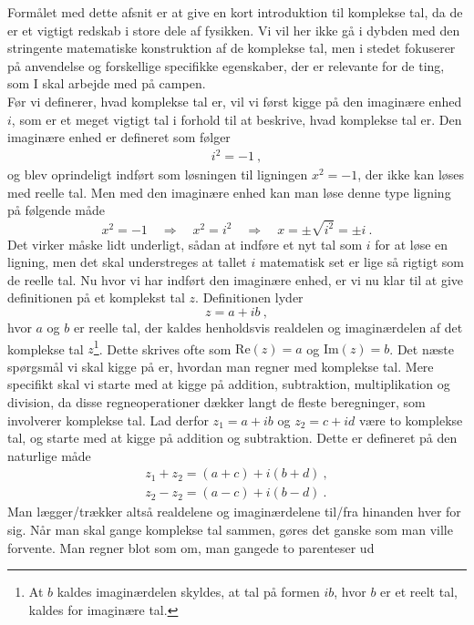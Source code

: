 Formålet med dette afsnit er at give en kort introduktion til komplekse tal, da de er et vigtigt redskab i store dele af fysikken. Vi vil her ikke gå i dybden med den stringente matematiske konstruktion af de komplekse tal, men i stedet fokuserer på anvendelse og forskellige specifikke egenskaber, der er relevante for de ting, som I skal arbejde med på campen.\\

Før vi definerer, hvad komplekse tal er, vil vi først kigge på den imaginære enhed $i$, som er et meget vigtigt tal i forhold til at beskrive, hvad komplekse tal er. Den imaginære enhed er defineret som følger
\begin{eqnarray}
i^2 = -1 \ ,
\end{eqnarray}
og blev oprindeligt indført som løsningen til ligningen $x^2 = -1$, der ikke kan løses med reelle tal. Men med den imaginære enhed kan man løse denne type ligning på følgende måde
$$x^2 = -1 \quad \Rightarrow \quad x^2 = i^2 \quad \Rightarrow \quad x = \pm \sqrt{i^2} = \pm i \ .$$
Det virker måske lidt underligt, sådan at indføre et nyt tal som $i$ for at løse en ligning, men det skal understreges at tallet $i$ matematisk set er lige så rigtigt som de reelle tal. Nu hvor vi har indført den imaginære enhed, er vi nu klar til at give definitionen på et komplekst tal $z$. Definitionen lyder 
\begin{equation}
z = a+ib \ ,
\label{kompleks_def}
\end{equation}  
hvor $a$ og $b$ er reelle tal, der kaldes henholdsvis realdelen og imaginærdelen af det komplekse tal $z$\footnote{At $b$ kaldes imaginærdelen skyldes, at tal på formen $ib$, hvor $b$ er et reelt tal, kaldes for imaginære tal.}.  Dette skrives ofte som $\text{Re}(z) = a$ og $\text{Im}(z) = b$. Det næste spørgsmål vi skal kigge på er, hvordan man regner med komplekse tal. Mere specifikt skal vi starte med at kigge på addition, subtraktion, multiplikation og division, da disse regneoperationer dækker langt de fleste beregninger, som involverer komplekse tal. Lad derfor $z_1 = a+ib$ og $z_2 = c+id$ være to komplekse tal, og starte med at kigge på addition og subtraktion. Dette er defineret på den naturlige måde
\begin{align}
\label{kompleks_add}
z_1+z_2 = (a+c) + i(b+d) \ , \\
\label{kompleks_sub}
z_2-z_2 = (a-c) + i(b-d) \ .
\end{align}
Man lægger/trækker altså realdelene og imaginærdelene til/fra hinanden hver for sig. Når man skal gange komplekse tal sammen, gøres det ganske som man ville forvente. Man regner blot som om, man gangede to parenteser ud
